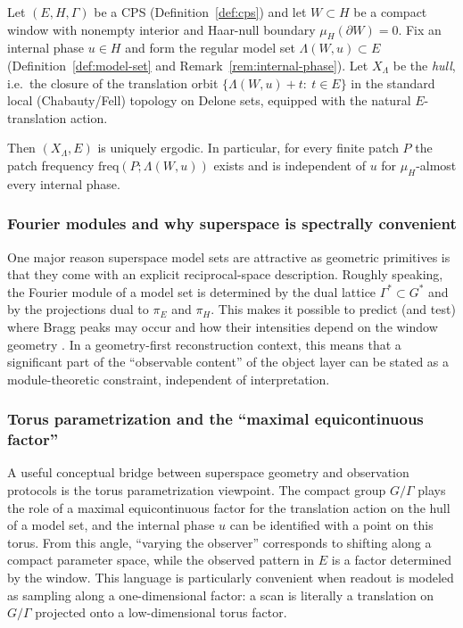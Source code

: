 \begin{proposition}\label{prop:unique-ergodicity}
Let $(E,H,\Gamma)$ be a CPS (Definition~\ref{def:cps}) and let $W\subset H$ be a compact window with nonempty interior and Haar-null boundary $\mu_H(\partial W)=0$. Fix an internal phase $u\in H$ and form the regular model set $\Lambda(W,u)\subset E$ (Definition~\ref{def:model-set} and Remark~\ref{rem:internal-phase}). Let $X_{\Lambda}$ be the \emph{hull}, i.e.\ the closure of the translation orbit $\{\Lambda(W,u)+t:\ t\in E\}$ in the standard local (Chabauty/Fell) topology on Delone sets, equipped with the natural $E$-translation action.

Then $(X_{\Lambda},E)$ is uniquely ergodic. In particular, for every finite patch $P$ the patch frequency $\mathrm{freq}(P;\Lambda(W,u))$ exists and is independent of $u$ for $\mu_H$-almost every internal phase.
\cite{Moody2000,BaakeGrimm2013}
\end{proposition}

\subsubsection{Fourier modules and why superspace is spectrally convenient}

One major reason superspace model sets are attractive as geometric primitives is that they come with an explicit reciprocal-space description. Roughly speaking, the Fourier module of a model set is determined by the dual lattice $\Gamma^{\ast}\subset G^{\ast}$ and by the projections dual to $\pi_E$ and $\pi_H$. This makes it possible to predict (and test) where Bragg peaks may occur and how their intensities depend on the window geometry \cite{Hof1995,BaakeGrimm2013}. In a geometry-first reconstruction context, this means that a significant part of the ``observable content'' of the object layer can be stated as a module-theoretic constraint, independent of interpretation.

\subsubsection{Torus parametrization and the ``maximal equicontinuous factor''}

A useful conceptual bridge between superspace geometry and observation protocols is the torus parametrization viewpoint. The compact group $G/\Gamma$ plays the role of a maximal equicontinuous factor for the translation action on the hull of a model set, and the internal phase $u$ can be identified with a point on this torus. From this angle, ``varying the observer'' corresponds to shifting along a compact parameter space, while the observed pattern in $E$ is a factor determined by the window. This language is particularly convenient when readout is modeled as sampling along a one-dimensional factor: a scan is literally a translation on $G/\Gamma$ projected onto a low-dimensional torus factor.
\cite{Thuswaldner2019,BertheYassawi2024}

